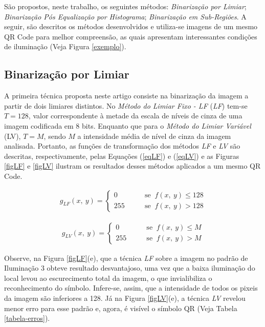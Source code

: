 \documentclass{ceel}
\begin{document}
\begin{multicols}{2}
São propostos, neste trabalho, os seguintes métodos: \emph{Binarização por Limiar}; \emph{Binarização Pós Equalização por Histograma}; \emph{Binarização em Sub-Regiões}. A seguir, são descritos os métodos desenvolvidos e utiliza-se imagens de um mesmo QR Code para melhor compreensão, as quais apresentam interessantes condições de iluminação (Veja Figura \ref{exemplo}).


\subsection{Binarização por Limiar} \label{Aconst}
A primeira técnica proposta neste artigo consiste na binarização da imagem a partir de dois limiares distintos. No \textit{Método do Limiar Fixo - LF} (\emph{LF}) tem-se 
$T=128$, valor correspondente à metade da escala de níveis de cinza de uma imagem codificada em 8 bits. Enquanto que para o \textit{Método do Limiar Variável} (LV), $T=M$,  sendo $M$ a intensidade média de nível de cinza da imagem analisada. Portanto, as funções de transformação dos métodos \textit{LF} e \textit{LV} são descritas, respectivamente, pelas Equações (\ref{eqLF}) e (\ref{eqLV}) e as Figuras \ref{figLF} e \ref{figLV} ilustram os resultados desses métodos aplicados a um mesmo QR Code.

\vspace{-0.01cm}
\begin{gather}
g_{LF}( x,\ y) =\begin{cases}
0 & \quad \quad \text{se }\ f( x,\ y) \leqslant 128\\
255 & \quad \quad \text{se }\ f( x,\ y)  >128
\end{cases}
\label{eqLF}
\end{gather}

\begin{gather}
g_{LV}( x,\ y) =\begin{cases}
0 & \quad \quad \text{se }\ f( x,\ y) \leqslant M\\
255 & \quad \quad \text{se }\ f( x,\ y)  >M
\end{cases}
\label{eqLV}
\end{gather}
\vspace{0.01cm}

Observe, na Figura \ref{figLF}(e), que a técnica \emph{LF} sobre a imagem no padrão de Iluminação 3 obteve resultado desvantajoso, uma vez que a baixa iluminação do local levou ao escurecimento total da imagem, o que invialibiliza o reconhecimento do símbolo. Infere-se, assim, que a intensidade de todos os pixeis da imagem são inferiores a 128. Já na Figura \ref{figLV}(e), a técnica \emph{LV} revelou menor erro para esse padrão e, agora, é visível o símbolo QR (Veja Tabela \ref{tabela-erros}). 


\end{multicols}
\end{document}
